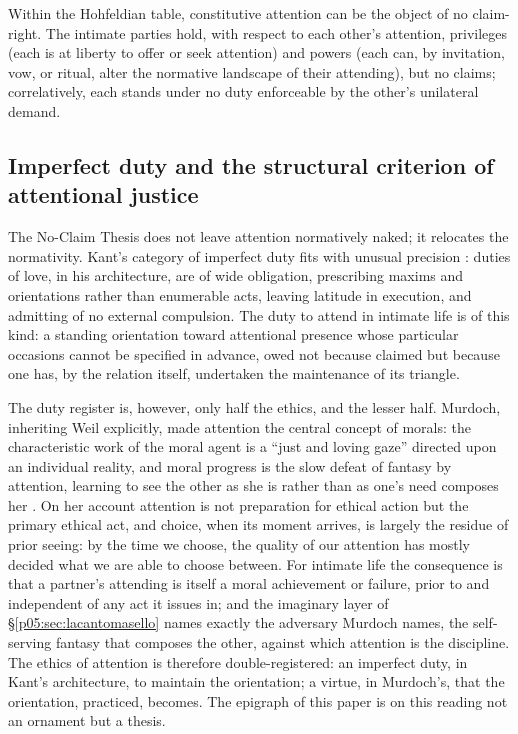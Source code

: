 \begin{prop}\label{p05:prop:noclaim}
Within the Hohfeldian table, constitutive attention can be the object of no claim-right. The intimate parties hold, with respect to each other's attention, privileges (each is at liberty to offer or seek attention) and powers (each can, by invitation, vow, or ritual, alter the normative landscape of their attending), but no claims; correlatively, each stands under no duty enforceable by the other's unilateral demand.
\end{prop}

\subsection{Imperfect duty and the structural criterion of attentional justice}
\label{p05:sec:imperfect}

The No-Claim Thesis does not leave attention normatively naked; it relocates the normativity. Kant's category of imperfect duty fits with unusual precision \parencite{kant1996}: duties of love, in his architecture, are of wide obligation, prescribing maxims and orientations rather than enumerable acts, leaving latitude in execution, and admitting of no external compulsion. The duty to attend in intimate life is of this kind: a standing orientation toward attentional presence whose particular occasions cannot be specified in advance, owed not because claimed but because one has, by the relation itself, undertaken the maintenance of its triangle.

The duty register is, however, only half the ethics, and the lesser half. Murdoch, inheriting Weil explicitly, made attention the central concept of morals: the characteristic work of the moral agent is a ``just and loving gaze'' directed upon an individual reality, and moral progress is the slow defeat of fantasy by attention, learning to see the other as she is rather than as one's need composes her \parencite{murdoch1970}. On her account attention is not preparation for ethical action but the primary ethical act, and choice, when its moment arrives, is largely the residue of prior seeing: by the time we choose, the quality of our attention has mostly decided what we are able to choose between. For intimate life the consequence is that a partner's attending is itself a moral achievement or failure, prior to and independent of any act it issues in; and the imaginary layer of §\ref{p05:sec:lacantomasello} names exactly the adversary Murdoch names, the self-serving fantasy that composes the other, against which attention is the discipline. The ethics of attention is therefore double-registered: an imperfect duty, in Kant's architecture, to maintain the orientation; a virtue, in Murdoch's, that the orientation, practiced, becomes. The epigraph of this paper is on this reading not an ornament but a thesis.

